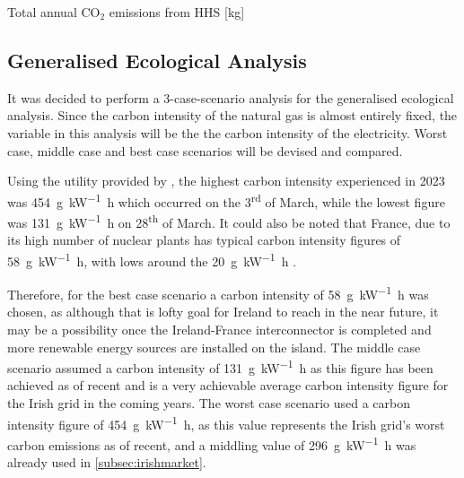 \begin{table}[htb]
    \footnotesize
    \centering
    \caption{Total annual $\text{CO}_2$ emissions from \acs{HHS} [kg]}
    \label{tbl:annualheatingco2}
\end{table}


\subsection{Generalised Ecological Analysis}
It was decided to perform a 3-case-scenario analysis for the generalised ecological analysis. Since the carbon intensity of the natural gas is almost entirely fixed, the variable in this analysis will be the the carbon intensity of the electricity. Worst case, middle case and best case scenarios will be devised and compared. 

Using the  \cite{eirgrid_group_explore_2023} utility provided by \citeauthor{eirgrid_group_explore_2023}, the highest carbon intensity experienced in 2023 was \qty{454}{\gram\per\kilo\watt\hour} which occurred on the 3\textsuperscript{rd} of March, while the lowest figure was \qty{131}{\gram\per\kilo\watt\hour} on 28\textsuperscript{th} of March. It could also be noted that France, due to its high number of nuclear plants has typical carbon intensity figures of \qty{58}{\gram\per\kilo\watt\hour}, with lows around the \qty{20}{\gram\per\kilo\watt\hour} \cite{iea2019world}.

Therefore, for the best case scenario a carbon intensity of \qty{58}{\gram\per\kilo\watt\hour} was chosen, as although that is lofty goal for Ireland to reach in the near future, it may be a possibility once the Ireland-France interconnector is completed and more renewable energy sources are installed on the island. The middle case scenario assumed a carbon intensity of \qty{131}{\gram\per\kilo\watt\hour} as this figure has been achieved as of recent and is a very achievable average carbon intensity figure for the Irish grid in the coming years. The worst case scenario used a carbon intensity figure of \qty{454}{\gram\per\kilo\watt\hour}, as this value represents the Irish grid's worst carbon emissions as of recent, and a middling value of \qty{296}{\gram\per\kilo\watt\hour} was already used in \cref{subsec:irishmarket}.

